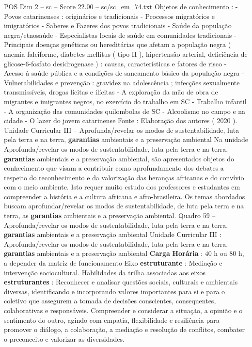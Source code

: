 \begin{textsample}{POS Dim 2 – sc – Score 22.00 – sc/sc\_em\_74.txt}
Objetos de conhecimento : - Povos catarinenses : originários e tradicionais - Processos migratórios e imigratórios - Saberes e Fazeres dos povos tradicionais - Saúde da população negra/etnosaúde - Especialistas locais de saúde em comunidades tradicionais - Principais doenças genéticas ou hereditárias que afetam a população negra ( anemia falciforme, diabetes mellitus ( tipo II ), hipertensão arterial, deficiência de glicose-6-fosfato desidrogenase ) : causas, características e fatores de risco - Acesso à saúde pública e a condições de saneamento básico da população negra - Vulnerabilidades e prevenção : gravidez na adolescência ; infecções sexualmente transmissíveis, drogas lícitas e ilícitas - A exploração da mão de obra de migrantes e imigrantes negros, no exercício do trabalho em SC - Trabalho infantil - A organização das comunidades quilombolas de SC - Alcoolismo no campo e na cidade - O lazer do jovem catarinense Fonte : Elaboração dos autores ( 2020 ).
Unidade Curricular III – Aprofunda/revelar os modos de sustentabilidade, luta pela terra e na terra, \textbf{garantias} ambientais e a preservação ambiental Na unidade Aprofunda/revelar os modos de sustentabilidade, luta pela terra e na terra, \textbf{garantias} ambientais e a preservação ambiental, são apresentados objetos do conhecimento que visam a contribuir como aprofundamento dos debates a respeito do reconhecimento e da valorização das heranças africanas e do convívio com o meio ambiente.
Isto requer muito estudo dos professores e estudantes em compreender a história e a cultura africana e afro-brasileira.
Os temas abordados buscam aprofundar/revelar os modos de sustentabilidade, de luta pela terra e na terra, as \textbf{garantias} ambientais e a preservação ambiental.
Quadro 59 – Aprofunda/revelar os modos de sustentabilidade, luta pela terra e na terra, \textbf{garantias} ambientais e a preservação ambiental Unidade Curricular III : Aprofunda/revelar os modos de sustentabilidade, luta pela terra e na terra, \textbf{garantias} ambientais e a preservação ambiental \textbf{Carga} \textbf{Horária} : 40 h ou 80 h, a depender da matriz de funcionamento Eixo \textbf{estruturante} : Mediação e intervenção sociocultural.
Habilidades da trilha associadas aos eixos \textbf{estruturantes} : Reconhecer e analisar questões sociais, culturais e ambientais diversas, identificando e incorporando valores importantes para si e para o coletivo que assegurem a tomada de decisões conscientes, consequentes, colaborativas e responsáveis.
Compreender e considerar a situação, a opinião e o sentimento do outro, agindo com empatia, flexibilidade e resiliência para promover o diálogo, a colaboração, a mediação e resolução de conflitos, combater o preconceito e valorizar as diversidades.

\end{textsample}
